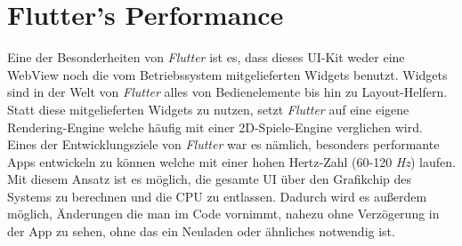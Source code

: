\section{Flutter's Performance}
Eine der Besonderheiten von \textit{Flutter} ist es, dass dieses UI-Kit weder eine WebView
noch die vom Betriebssystem mitgelieferten Widgets benutzt. Widgets sind in der
Welt von \textit{Flutter} alles von Bedienelemente bis hin zu Layout-Helfern.
Statt diese mitgelieferten Widgets zu nutzen, setzt \textit{Flutter} auf eine
eigene Rendering-Engine welche häufig mit einer 2D-Spiele-Engine verglichen wird.
Eines der Entwicklungsziele von \textit{Flutter} war es nämlich,
besonders performante Apps entwickeln zu können welche mit einer hohen
Hertz-Zahl (60-120 \textit{Hz}) laufen. Mit diesem Ansatz ist es möglich,
die gesamte UI über den Grafikchip des Systems zu berechnen und die CPU zu entlassen.
Dadurch wird es außerdem möglich, Änderungen die man im Code vornimmt,
nahezu ohne Verzögerung in der App zu sehen, ohne das ein Neuladen oder ähnliches
notwendig ist.
